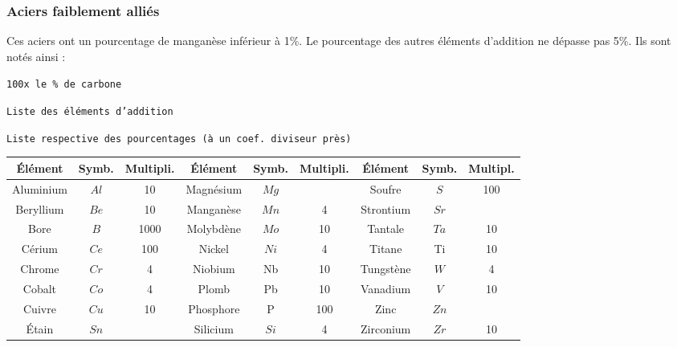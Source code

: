 \documentclass[11pt,oneside]{article}
\begin{document}
\subsubsection{Aciers faiblement alliés}
\begin{resultat}
Ces aciers ont un pourcentage de manganèse inférieur à 1\%. Le pourcentage des autres éléments d'addition ne dépasse pas 5\%. Ils sont notés ainsi :


\begin{minipage}[c]{.3\linewidth}
\begin{center}
\texttt{100x le \% de carbone}
\end{center}
\end{minipage} \hfill
\begin{minipage}[c]{.3\linewidth}
\begin{center}
\texttt{Liste des éléments d'addition}
\end{center}
\end{minipage} \hfill
\begin{minipage}[c]{.3\linewidth}
\begin{center}
\texttt{Liste respective des pourcentages (à un coef. diviseur près)}
\end{center}
\end{minipage} 

\end{resultat}

\begin{center}
\begin{tabular}{|c|c|c||c|c|c||c|c|c|}
\hline
Élément	 & Symb. & Multipli. & Élément & Symb. & Multipli. & Élément & Symb. & Multipl. \\
\hline
\hline
Aluminium & $Al$ & 10 & Magnésium & $Mg$ && Soufre & $S$ & 100 \\ \hline
Beryllium  & $Be$ & 10 & Manganèse & $Mn$ & 4 & Strontium & $Sr$	& \\ \hline
Bore	       & $B$ & 1000 & Molybdène & $Mo$ & 10 & Tantale & $Ta$ & 10 \\ \hline
Cérium    & $Ce$ & 100 & Nickel & $Ni$ & 4 & Titane & Ti & 10 \\ \hline
Chrome   & $Cr$ & 4 & Niobium & Nb & 10 & Tungstène & $W$ & 4 \\ \hline
Cobalt     & $Co$  & 4 & Plomb & Pb & 10 & Vanadium	 & $V$ & 10 \\ \hline
Cuivre     & $Cu$ & 10 & Phosphore & P & 100 & Zinc & $Zn$ &\\ \hline
Étain	       &$Sn$ && Silicium & $Si$ & 4 & Zirconium & $Zr$ & 10 \\
\hline
\end{tabular}
\end{center}
\end{document}
